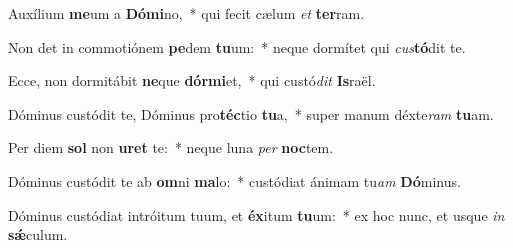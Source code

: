 \item Auxílium \textbf{me}um a \textbf{Dó}\textbf{mi}no,~* qui fecit cælum \textit{et} \textbf{ter}ram.
\item Non det in commotiónem \textbf{pe}dem \textbf{tu}um:~* neque dormítet qui \textit{cus}\textbf{tó}dit te.
\item Ecce, non dormitábit \textbf{ne}que \textbf{dór}\textbf{mi}et,~* qui custó\textit{dit} \textbf{Is}raël.
\item Dóminus custódit te, Dóminus pro\textbf{téc}tio \textbf{tu}a,~* super manum déxte\textit{ram} \textbf{tu}am.
\item Per diem \textbf{sol} non \textbf{u}\textbf{ret} te:~* neque luna \textit{per} \textbf{noc}tem.
\item Dóminus custódit te ab \textbf{om}ni \textbf{ma}lo:~* custódiat ánimam tu\textit{am} \textbf{Dó}minus.
\item Dóminus custódiat intróitum tuum, et \textbf{éx}itum \textbf{tu}um:~* ex hoc nunc, et usque \textit{in} \textbf{sǽ}culum.
